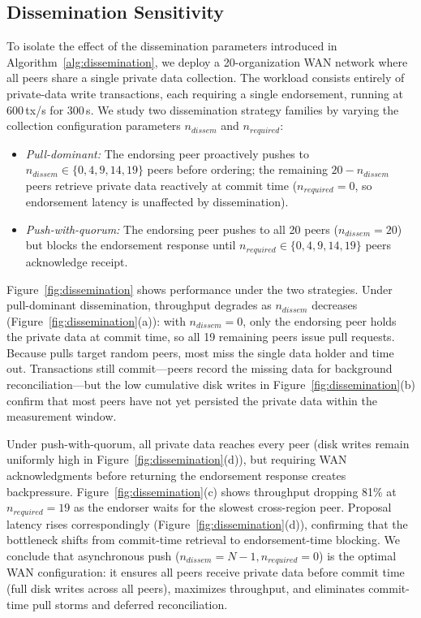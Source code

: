 \subsection{Dissemination Sensitivity}
To isolate the effect of the dissemination parameters introduced in Algorithm~\ref{alg:dissemination}, we deploy a 20-organization WAN network where all peers share a single private data collection.
The workload consists entirely of private-data write transactions, each requiring a single endorsement, running at 600\,tx/s for 300\,s.
We study two dissemination strategy families by varying the collection configuration parameters $n_{dissem}$ and $n_{required}$:
\begin{itemize}[topsep=0pt,noitemsep,leftmargin=15pt]
\item \textit{Pull-dominant:} The endorsing peer proactively pushes to $n_{dissem} \in \{0, 4, 9, 14, 19\}$ peers before ordering; the remaining $20 - n_{dissem}$ peers retrieve private data reactively at commit time ($n_{required} = 0$, so endorsement latency is unaffected by dissemination).
\item \textit{Push-with-quorum:} The endorsing peer pushes to all 20 peers ($n_{dissem} = 20$) but blocks the endorsement response until $n_{required} \in \{0, 4, 9, 14, 19\}$ peers acknowledge receipt.
\end{itemize}

Figure~\ref{fig:dissemination} shows performance under the two strategies. Under pull-dominant dissemination, throughput degrades as $n_{dissem}$ decreases (Figure~\ref{fig:dissemination}(a)): with $n_{dissem}=0$, only the endorsing peer holds the private data at commit time, so all 19 remaining peers issue pull requests. Because pulls target random peers, most miss the single data holder and time out. Transactions still commit---peers record the missing data for background reconciliation---but the low cumulative disk writes in Figure~\ref{fig:dissemination}(b) confirm that most peers have not yet persisted the private data within the measurement window.

Under push-with-quorum, all private data reaches every peer (disk writes remain uniformly high in Figure~\ref{fig:dissemination}(d)), but requiring WAN acknowledgments before returning the endorsement response creates backpressure. Figure~\ref{fig:dissemination}(c) shows throughput dropping 81\% at $n_{required}=19$ as the endorser waits for the slowest cross-region peer. Proposal latency rises correspondingly (Figure~\ref{fig:dissemination}(d)), confirming that the bottleneck shifts from commit-time retrieval to endorsement-time blocking.
We conclude that asynchronous push ($n_{dissem}=N{-}1, n_{required}=0$) is the optimal WAN configuration: it ensures all peers receive private data before commit time (full disk writes across all peers), maximizes throughput, and eliminates commit-time pull storms and deferred reconciliation.


